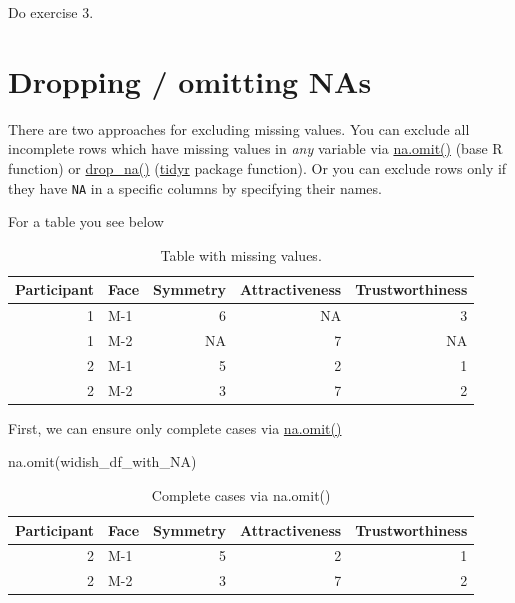 \documentclass[
]{book}
\newenvironment{Shaded}{\begin{snugshade}}{\end{snugshade}}
\newcommand{\FunctionTok}[1]{\textcolor[rgb]{0.00,0.00,0.00}{#1}}
\newcommand{\NormalTok}[1]{#1}
\begin{document}
Do exercise 3.

\hypertarget{na.omit}{%
\section{Dropping / omitting NAs}\label{na.omit}}

There are two approaches for excluding missing values. You can exclude all incomplete rows which have missing values in \emph{any} variable via \href{https://stat.ethz.ch/R-manual/R-devel/library/stats/html/na.fail.html}{na.omit()} (base R function) or \href{https://tidyr.tidyverse.org/reference/drop_na.html}{drop\_na()} (\href{https://tidyr.tidyverse.org/}{tidyr} package function). Or you can exclude rows only if they have \texttt{NA} in a specific columns by specifying their names.

For a table you see below

\begin{table}

\caption{\label{tab:unnamed-chunk-282}Table with missing values.}
\centering
\begin{tabular}[t]{r|l|r|r|r}
\hline
Participant & Face & Symmetry & Attractiveness & Trustworthiness\\
\hline
1 & M-1 & 6 & NA & 3\\
\hline
1 & M-2 & NA & 7 & NA\\
\hline
2 & M-1 & 5 & 2 & 1\\
\hline
2 & M-2 & 3 & 7 & 2\\
\hline
\end{tabular}
\end{table}

First, we can ensure only complete cases via \href{https://stat.ethz.ch/R-manual/R-devel/library/stats/html/na.fail.html}{na.omit()}

\begin{Shaded}
\begin{Highlighting}[]
\FunctionTok{na.omit}\NormalTok{(widish\_df\_with\_NA)}
\end{Highlighting}
\end{Shaded}

\begin{table}

\caption{\label{tab:unnamed-chunk-283}Complete cases via na.omit()}
\centering
\begin{tabular}[t]{r|l|r|r|r}
\hline
Participant & Face & Symmetry & Attractiveness & Trustworthiness\\
\hline
2 & M-1 & 5 & 2 & 1\\
\hline
2 & M-2 & 3 & 7 & 2\\
\hline
\end{tabular}
\end{table}
\end{document}

